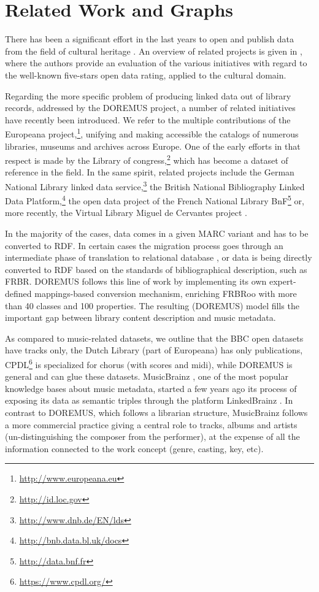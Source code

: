 \section{Related Work and Graphs} \label{sec:relwork}
There has been a significant effort in the last years to open and publish data from the field of cultural heritage \cite{dijkshoorn2014rijksmuseum}. An overview of related projects is given in \cite{marden2013linked}, where the authors provide an evaluation of the various initiatives with regard to the well-known five-stars open data  rating, applied to the cultural domain.%

Regarding the more specific problem of producing linked data out of library records, addressed by the DOREMUS project, a number of related initiatives have recently been introduced. We refer to the multiple contributions of the Europeana project,\footnote{\url{http://www.europeana.eu}}, unifying and making accessible the catalogs of  numerous libraries, museums and archives across Europe. One of the early efforts in that respect is made by the Library of congress,\footnote{\url{http://id.loc.gov}} which has become a dataset of reference in the field. In the same spirit, related projects include the German National Library linked data service,\footnote{\url{http://www.dnb.de/EN/lds}} the British National Bibliography Linked Data Platform,\footnote{\url{http://bnb.data.bl.uk/docs}} the open data project of the French National Library BnF\footnote{\url{http://data.bnf.fr}} or, more recently, the Virtual Library  Miguel de Cervantes project \cite{candela2017migration}.

In the majority of the cases, data comes  in a given MARC variant and has to be converted to RDF. In certain cases the migration process goes through an intermediate phase of translation to relational database \cite{candela2017migration}, or data is being directly converted to RDF based on the standards of bibliographical description, such as FRBR. DOREMUS follows this line of work by implementing its own expert-defined mappings-based conversion mechanism, enriching FRBRoo with more than 40 classes and 100 properties. The resulting (DOREMUS) model fills the important gap between library content description and music metadata. 

As compared to music-related datasets, we outline that the BBC open datasets have tracks only, the Dutch Library (part of Europeana) has only publications, CPDL\footnote{\url{https://www.cpdl.org/}} is specialized for chorus (with scores and midi), while DOREMUS is general and can glue these datasets. MusicBrainz \cite{musicbrainz}, one of the most popular knowledge bases about music metadata, started a few years ago its process of exposing its data as semantic triples through the platform LinkedBrainz \cite{linkedbrainz}. In contrast to DOREMUS, which follows a librarian structure, MusicBrainz follows a more commercial practice giving a central role to tracks, albums and artists (un-distinguishing the composer from the performer), at the expense of all the information connected to the work concept (genre, casting, key, etc).